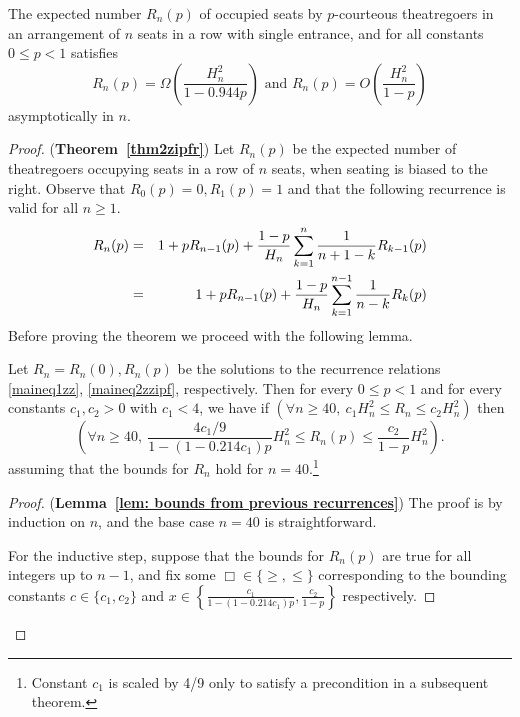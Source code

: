 \documentclass[11pt]{llncs}
\begin{document}
\begin{theorem}
\label{thm2zipfr}
The expected number $R_n(p)$ of occupied seats by $p$-courteous theatregoers
in an arrangement of $n$ seats
in a row with single entrance, and for all constants $0 \leq p<1$ satisfies 
$$R_n(p) = \Omega \left( \frac{H_n^2}{1 - 0.944p} \right)
\mbox{ and } R_n(p) = O\left( \frac{H_n^2}{1-p} \right)$$
asymptotically in $n$.
\end{theorem}


\begin{proof} ({\bf Theorem~\ref{thm2zipfr}})
Let $R_n(p)$ be the expected number of theatregoers occupying seats 
in a row of $n$ seats,
when seating is biased to the right.
Observe that $R_0(p)=0, R_1(p) =1$ and that the following recurrence is valid
for all $n \geq 1$.
\begin{eqnarray}
R_n(p) 
&=& \notag
1 + p R_{n-1}(p) + \frac{1-p}{H_n} \sum_{k=1}^{n} \frac{1}{n+1-k} R_{k-1}(p)\\
&=&  \label{maineq2zzipf} 
1 + p R_{n-1}(p) + \frac{1-p}{H_n} \sum_{k=1}^{n-1} \frac{1}{n-k} R_{k}(p)
\end{eqnarray}
Before proving the theorem we proceed with the following lemma.

\begin{lemma}\label{lem: bounds from previous recurrences}
Let $R_n=R_n(0), R_n(p)$ be the solutions to the recurrence relations \eqref{maineq1zz}, \eqref{maineq2zzipf},  respectively. Then for every $0\leq p <1$ and for every constants $c_1, c_2 >0$ with $c_1<4$, we have if 
$
\left( \forall n \geq 40, ~c_1 H_n^2 \leq R_n \leq c_2 H_n^2  \right)
$
then
$$
\left( \forall n \geq 40, ~\frac{4c_1/9}{1-(1-0.214c_1)p} H_n^2 \leq R_n(p) \leq \frac{c_2}{1-p} H_n^2 \right).$$
assuming that the bounds for $R_n$ hold for $n=40$.\footnote{Constant $c_1$ is scaled by 4/9 only to satisfy a precondition in a subsequent theorem.}
\end{lemma}

\begin{proof} ({\bf Lemma~\ref{lem: bounds from previous recurrences}})
The proof is by induction on $n$, and the base case $n=40$ is straightforward. 

For the inductive step, suppose that the bounds for $R_n(p)$ are true for all integers up to $n-1$, and fix some $\Box \in \{\geq, \leq\}$ corresponding to the bounding constants $c \in \{c_1, c_2\}$ and $x \in \left\{\frac{c_1}{1-(1-0.214c_1)p},\frac{c_2}{1-p}\right\}$ respectively. 


\end{proof}
\end{proof}
\end{document}
